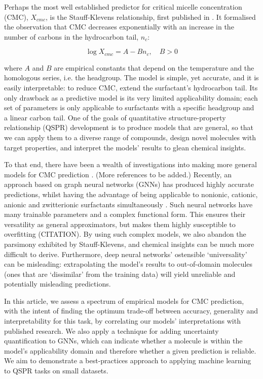 Perhaps the most well established predictor for critical micelle concentration
(CMC), $X_{cmc}$, is the Stauff-Klevens relationship, first published in
\citeyear{klevensStructureAggregationDilate1953}
\cite{klevensStructureAggregationDilate1953}. It formalised the observation that
CMC decreases exponentially with an increase in the number of carbons in the
hydrocarbon tail, $n_c$:

\begin{equation}
    \label{eq:klevens}
    \log X_{cmc} = A - Bn_c, \quad B > 0
\end{equation}

where $A$ and $B$ are empirical constants that depend on the temperature and the
homologous series, i.e. the headgroup. The model is simple, yet accurate, and it
is easily interpretable: to reduce CMC, extend the surfactant's hydrocarbon
tail. Its only drawback as a predictive model is its very limited applicability
domain; each set of parameters is only applicable to surfactants with a specific
headgroup and a linear carbon tail. One of the goals of quantitative
structure-property relationship (QSPR) development is to produce models that are
general, so that we can apply them to a diverse range of compounds, design novel
molecules with target properties, and interpret the models' results to glean
chemical insights.

To that end, there have been a wealth of investigations into making more general
models for CMC prediction
\cite{gaudinNewQSPRModels2016,jakobtorweihenPredictingCriticalMicelle2017,matteiModelingCriticalMicelle2013}.
(More references to be added.) Recently, an approach based on graph neural
networks (GNNs) has produced highly accurate predictions, whilst having the
advantage of being applicable to nonionic, cationic, anionic and zwitterionic
surfactants simultaneously \cite{qinPredictingCriticalMicelle2021a}. Such neural
networks have many trainable parameters and a complex functional form. This
ensures their versatility as general approximators, but makes them highly
susceptible to overfitting (CITATION). By using such complex models, we also
abandon the parsimony exhibited by Stauff-Klevens, and chemical insights can be
much more difficult to derive. Furthermore, deep neural networks' ostensible
`universality' can be misleading: extrapolating the model's results to
out-of-domain molecules (ones that are `dissimilar' from the training data) will
yield unreliable and potentially misleading predictions.

In this article, we assess a spectrum of empirical models for CMC prediction,
with the intent of finding the optimum trade-off between accuracy, generality
and interpretability for this task, by correlating our models' interpretations
with published research. We also apply a technique for adding uncertainty
quantification to GNNs, which can indicate whether a molecule is within the
model's applicability domain and therefore whether a given prediction is
reliable. We aim to demonstrate a best-practices approach to applying machine
learning to QSPR tasks on small datasets.
